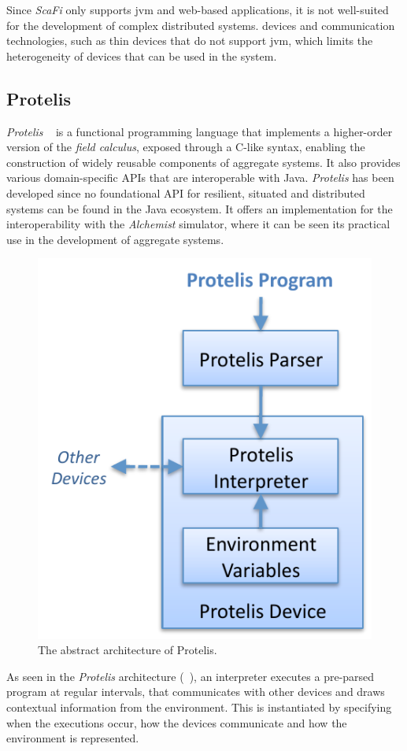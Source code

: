 Since \emph{ScaFi} only supports \ac{jvm} and web-based applications, it is not well-suited for the development of complex distributed systems.
devices and communication technologies, such as thin devices that do not support \ac{jvm}, which limits the heterogeneity of
devices that can be used in the system.

\subsection{Protelis}
\label{subsec:protelis}
\emph{Protelis} ~\cite{protelis} is a functional programming language that implements a higher-order version of the \emph{field calculus},
exposed through a C-like syntax, enabling the construction of widely reusable components of aggregate systems.
It also provides various domain-specific APIs that are interoperable with Java.
\emph{Protelis} has been developed since no foundational API for resilient, situated and distributed systems can be found
in the Java ecosystem.
It offers an implementation for the interoperability with the \emph{Alchemist} simulator, where it can be seen its
practical use in the development of aggregate systems.

\begin{figure}
    \centering
    \includegraphics[width=.5\linewidth]{figures/protelis-structure}
    \caption{The abstract architecture of Protelis.}
    \label{fig:protelis-structure}
\end{figure}

As seen in the \emph{Protelis} architecture (~), an interpreter executes a pre-parsed program at regular intervals,
that communicates with other devices and draws contextual information from the environment.
This is instantiated by specifying when the executions occur, how the devices communicate and how the environment is
represented.

